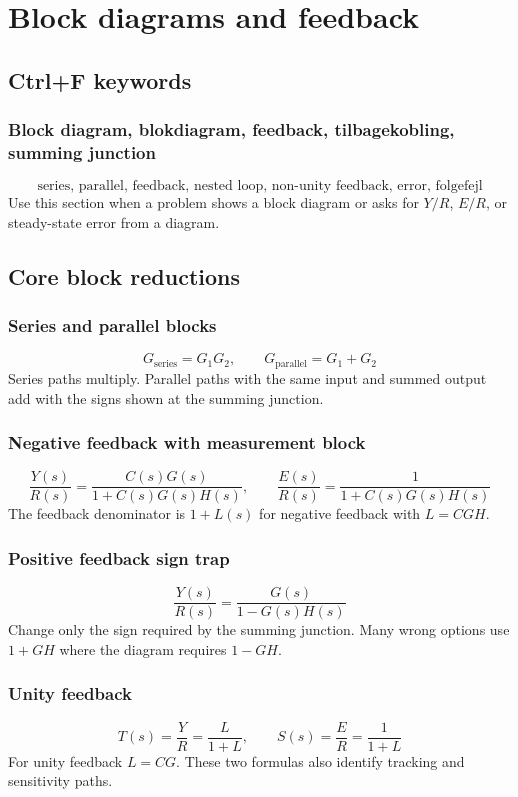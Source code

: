 \section{Block diagrams and feedback}

\subsection{Ctrl+F keywords}

\subsubsection{Block diagram, blokdiagram, feedback, tilbagekobling, summing junction}
\[
\text{series, parallel, feedback, nested loop, non-unity feedback, error, folgefejl}
\]
Use this section when a problem shows a block diagram or asks for \(Y/R\), \(E/R\), or steady-state error from a diagram.

\subsection{Core block reductions}

\subsubsection{Series and parallel blocks}
\[
G_{\mathrm{series}}=G_1G_2,\qquad G_{\mathrm{parallel}}=G_1+G_2
\]
Series paths multiply. Parallel paths with the same input and summed output add with the signs shown at the summing junction.

\subsubsection{Negative feedback with measurement block}
\[
\frac{Y(s)}{R(s)}=\frac{C(s)G(s)}{1+C(s)G(s)H(s)},\qquad
\frac{E(s)}{R(s)}=\frac{1}{1+C(s)G(s)H(s)}
\]
The feedback denominator is \(1+L(s)\) for negative feedback with \(L=CGH\).

\subsubsection{Positive feedback sign trap}
\[
\frac{Y(s)}{R(s)}=\frac{G(s)}{1-G(s)H(s)}
\]
Change only the sign required by the summing junction. Many wrong options use \(1+GH\) where the diagram requires \(1-GH\).

\subsubsection{Unity feedback}
\[
T(s)=\frac{Y}{R}=\frac{L}{1+L},\qquad
S(s)=\frac{E}{R}=\frac{1}{1+L}
\]
For unity feedback \(L=CG\). These two formulas also identify tracking and sensitivity paths.

